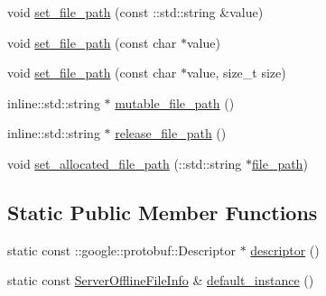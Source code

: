 \begin{DoxyCompactItemize}
\item 
void \hyperlink{class_i_m_1_1_base_define_1_1_server_offline_file_info_a8615ba7f69d3e858bb027199c19baf2f}{set\+\_\+file\+\_\+path} (const \+::std\+::string \&value)
\item 
void \hyperlink{class_i_m_1_1_base_define_1_1_server_offline_file_info_a2e669504197ceea5cdfd75ac3cc160ff}{set\+\_\+file\+\_\+path} (const char $\ast$value)
\item 
void \hyperlink{class_i_m_1_1_base_define_1_1_server_offline_file_info_ac73d9819a923f0d1befc592e75bac0bb}{set\+\_\+file\+\_\+path} (const char $\ast$value, size\+\_\+t size)
\item 
inline\+::std\+::string $\ast$ \hyperlink{class_i_m_1_1_base_define_1_1_server_offline_file_info_a6a14bc3c0bde47ae3f8bd9c1d06b6323}{mutable\+\_\+file\+\_\+path} ()
\item 
inline\+::std\+::string $\ast$ \hyperlink{class_i_m_1_1_base_define_1_1_server_offline_file_info_aab7f09f6b3ba3ba12e5f7404d638c7f6}{release\+\_\+file\+\_\+path} ()
\item 
void \hyperlink{class_i_m_1_1_base_define_1_1_server_offline_file_info_a81b481e7edac4c6d996626b5c52c762a}{set\+\_\+allocated\+\_\+file\+\_\+path} (\+::std\+::string $\ast$\hyperlink{class_i_m_1_1_base_define_1_1_server_offline_file_info_a356267794635afda3f373d66e91f91bc}{file\+\_\+path})
\end{DoxyCompactItemize}
\subsection*{Static Public Member Functions}
\begin{DoxyCompactItemize}
\item 
static const \+::google\+::protobuf\+::\+Descriptor $\ast$ \hyperlink{class_i_m_1_1_base_define_1_1_server_offline_file_info_a8feca7e4ef62e654a43a85d5a3098c5b}{descriptor} ()
\item 
static const \hyperlink{class_i_m_1_1_base_define_1_1_server_offline_file_info}{Server\+Offline\+File\+Info} \& \hyperlink{class_i_m_1_1_base_define_1_1_server_offline_file_info_ac9e7bc7523534515bb906e98ab36d54e}{default\+\_\+instance} ()
\end{DoxyCompactItemize}
